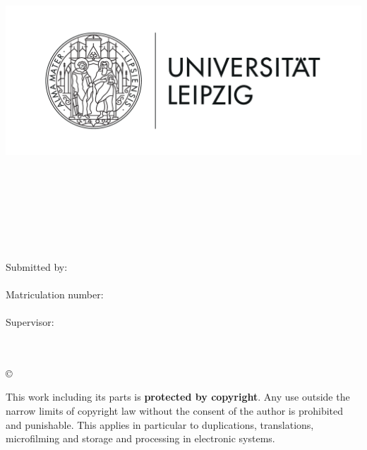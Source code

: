 \thispagestyle{plain}
\begin{titlepage}

  \begin{center}
    \includegraphics[height=7cm]{Bilder/Uni-L.png}\\[2.5ex]

    \hochschule\\
    \institut\\
    \fakultaet\\
    \fachgebiet\\[6ex]

    \textbf{\large\titel}\\[1.5ex]
    \art\\[6ex]

    \normalsize
    Submitted by:\\
    \autor\\[1.5ex]
    Matriculation number:\\
    \matrikelnr\\[1.5ex]
    Supervisor:\\
    \erstbetreuer\\
    \zweitbetreuer\\[1.0ex]
  \end{center}


  \begin{center}
    \copyright\ \jahr\\[1.0ex]
  \end{center}

  \singlespacing
  \small
  \noindent This work including its parts is \textbf{protected by copyright}. Any use outside the narrow limits of copyright law without the consent of the author is prohibited and punishable. This applies in particular to duplications, translations, microfilming and storage and processing in electronic systems.

\end{titlepage}

